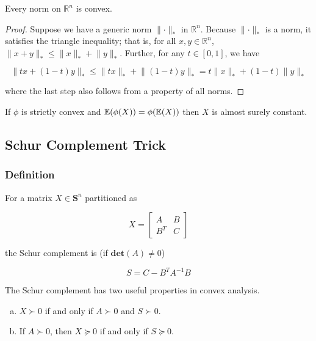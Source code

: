 \begin{proposition}\label{cvx.norm.cvx}Every norm on \(\mathbb{R}^n\) is convex. 

\end{proposition}

\begin{proof}Suppose we have a generic norm \(\lVert \cdot \rVert_*\) in \(\mathbb{R}^n\). Because  \(\lVert \cdot \rVert_*\) is a norm, it satisfies the triangle inequality; that is, for all \(x, y \in \mathbb{R}^n\),\(\lVert x + y \rVert_* \leq \lVert x  \rVert_*  + \lVert  y \rVert_*\). Further, for any \(t \in [0,1]\), we have


\[
\lVert tx + (1-t)y \rVert_* \leq \lVert tx  \rVert_*  + \lVert(1-t)  y \rVert_* =  t\lVert x  \rVert_*  +  (1-t) \lVert y \rVert_*
\]

where the last step also follows from a property of all norms.


\end{proof}

\begin{proposition}If \(\phi\) is strictly convex and \(\mathbb{E}(\phi(X)) = \phi(\mathbb{E}(X))\) then \(X\) is almost surely constant.

\end{proposition}


\subsection{Schur Complement Trick}\label{cvx.schur.sec}

\subsubsection{Definition}

For a matrix \(X \in \boldsymbol{S}^n\) partitioned as 

\[
X = \begin{bmatrix} A & B \\ B^T & C\end{bmatrix}
\]

the Schur complement is (if \(\textbf{det}(A) \neq 0\))

\[
S = C - B^TA^{-1} B
\]

The Schur complement has two useful properties in convex analysis.

\begin{theorem}\label{cvx.schur.props}

\begin{enumerate}[(a)]

\item \(X \succ 0\) if and only if \(A \succ 0\) and \(S \succ 0\).

\item If \(A \succ 0\), then \(X \succeq 0\) if and only if \(S \succeq 0\).

\end{enumerate}

\end{theorem}

